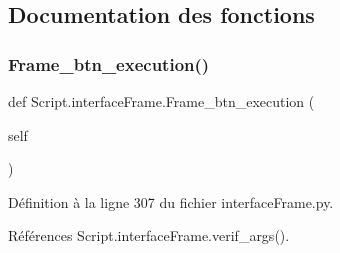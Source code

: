 \subsection{Documentation des fonctions}
\mbox{\label{namespaceScript_1_1interfaceFrame_ae94a2df22674070fddf2ae5197a09a6f}} 
\subsubsection{\texorpdfstring{Frame\+\_\+btn\+\_\+execution()}{Frame\_btn\_execution()}}
{\footnotesize\ttfamily def Script.\+interface\+Frame.\+Frame\+\_\+btn\+\_\+execution (\begin{DoxyParamCaption}\item[{}]{self }\end{DoxyParamCaption})}



Définition à la ligne 307 du fichier interface\+Frame.\+py.



Références Script.\+interface\+Frame.\+verif\+\_\+args().


